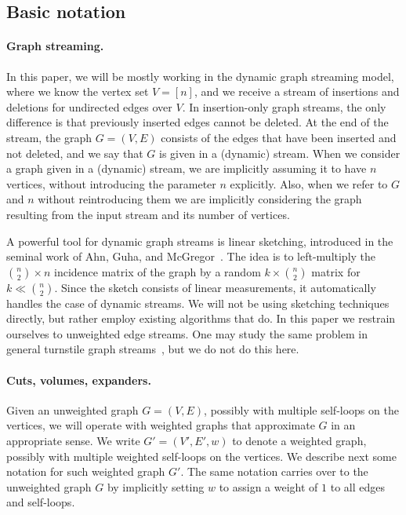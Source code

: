 \documentclass[epsfig,letter,11pt]{article}
\numberwithin{equation}{section}
\begin{document}
\subsection{Basic notation}
\label{subsec:basic}

\paragraph{Graph streaming.} In this paper, we will be mostly working in the dynamic graph streaming model, where we know the vertex set $V=[n]$, and we receive a stream of insertions and deletions for undirected edges over $V$. In insertion-only graph streams, the only difference is that previously inserted edges cannot be deleted. At the end of the stream, the graph $G=(V,E)$ consists of the edges that have been inserted and not deleted, and we say that $G$ is given in a (dynamic) stream. When we consider a graph given in a (dynamic) stream, we are implicitly assuming it to have $n$ vertices, without introducing the parameter $n$ explicitly. Also, when we refer to $G$ and $n$ without reintroducing them we are implicitly considering the graph resulting from the input stream and its number of vertices.

A powerful tool for dynamic graph streams is linear sketching, introduced in the seminal work of Ahn, Guha, and McGregor~\cite{linmeas}. The idea is to left-multiply the $\binom{n}{2} \times n$ incidence matrix of the graph by a random $k \times \binom{n}{2}$ matrix for $k \ll \binom{n}{2}$. Since the sketch consists of linear measurements, it automatically handles the case of dynamic streams. We will not be using sketching techniques directly, but rather employ existing algorithms that do. In this paper we restrain ourselves to unweighted edge streams. One may study the same problem in general turnstile graph streams~\cite{weightedlinearspars}, but we do not do this here.

\paragraph{Cuts, volumes, expanders.} Given an unweighted graph $G=(V, E)$, possibly with multiple self-loops on the vertices, we will operate with weighted graphs that approximate $G$ in an appropriate sense. We write $G'=(V',E', w)$ to denote a weighted graph, possibly with multiple weighted self-loops on the vertices. We describe next some notation for such weighted graph $G'$. The same notation carries over to the unweighted graph $G$ by implicitly setting $w$ to assign a weight of $1$ to all edges and self-loops.
\end{document}
